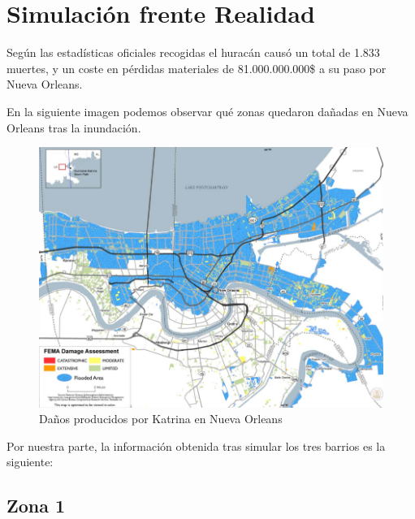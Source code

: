 \section{Simulación frente Realidad}

Según las estadísticas oficiales recogidas\cite{Blake07}\cite{Knabb05} el
huracán causó un total de 1.833 muertes, y un coste en pérdidas materiales de
81.000.000.000\$ a su paso por Nueva Orleans.

En la siguiente imagen podemos observar qué zonas quedaron dañadas en Nueva
Orleans tras la inundación\cite{Gabe05}.

\begin{figure}[H]
 \centering
 \includegraphics[width=135mm]{figuras/cap6/NOdamage.png}
 \caption{Daños producidos por Katrina en Nueva Orleans}
\end{figure}

Por nuestra parte, la información obtenida tras simular los tres barrios es la
siguiente:

\subsection{Zona 1}


